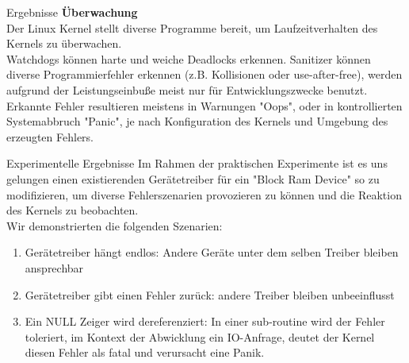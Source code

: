 \documentclass{beamer}
\begin{document}
\begin{frame}[t]
\begin{columns}[t]
\begin{column2}
\begin{block}{Ergebnisse}
\textbf{Überwachung} \\
Der Linux Kernel stellt diverse Programme bereit, um Laufzeitverhalten des Kernels zu überwachen. \\
Watchdogs können harte und weiche Deadlocks erkennen. Sanitizer können diverse Programmierfehler erkennen (z.B. Kollisionen oder use-after-free), werden aufgrund der Leistungseinbuße meist nur für Entwicklungszwecke benutzt. \\
Erkannte Fehler resultieren meistens in Warnungen "Oops", oder in kontrollierten Systemabbruch "Panic", je nach Konfiguration des Kernels und Umgebung des erzeugten Fehlers.
\end{block}

\begin{block}{Experimentelle Ergebnisse}
Im Rahmen der praktischen Experimente ist es uns gelungen einen existierenden Gerätetreiber für ein "Block Ram Device" so zu modifizieren, um diverse Fehlerszenarien provozieren zu können und die Reaktion des Kernels zu beobachten. \\
Wir demonstrierten die folgenden Szenarien: 
\begin{enumerate}
	\item Gerätetreiber hängt endlos: Andere Geräte unter dem selben Treiber bleiben ansprechbar
	\item Gerätetreiber gibt einen Fehler zurück: andere Treiber bleiben unbeeinflusst
	\item Ein NULL Zeiger wird dereferenziert: In einer sub-routine wird der Fehler toleriert, im Kontext der Abwicklung ein IO-Anfrage, deutet der Kernel diesen Fehler als fatal und verursacht eine Panik.
\end{enumerate}
\end{block}
\end{column2}
\end{columns}
\end{frame}
\end{document}

